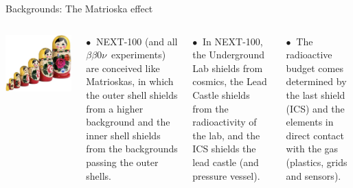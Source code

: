 \documentclass [aspectratio=169]{beamer}
\newcommand{\bbonu}{\ensuremath{\beta\beta0\nu}}
\begin{document}
\begin{frame}{Backgrounds: The Matrioska effect}
\begin{columns}
\includegraphics[scale=0.40]{matrioska.png}

$\bullet~$ NEXT-100 (and all \bbonu\ experiments) are conceived like Matrioskas, in which the outer shell shields from a higher background and the inner shell shields from the backgrounds passing the outer shells. 

$\bullet~$ In NEXT-100, the Underground Lab shields from cosmics, the Lead Castle shields from the radioactivity of the lab, and the ICS shields the lead castle (and pressure vessel).

$\bullet~$ The radioactive budget comes determined by the last shield (ICS) and the elements in direct contact with the gas (plastics, grids and sensors). 
 \end{columns}
\end{frame}

\end{document}
